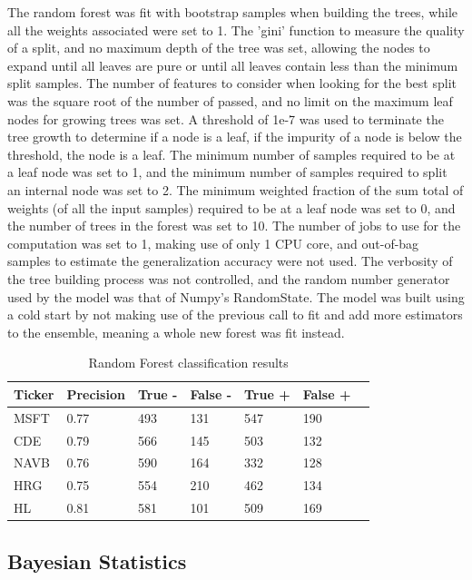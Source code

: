\documentclass[times]{jtitauth}
\begin{document}
The random forest was fit with bootstrap samples when building the trees, while all the weights associated were set to 1. The 'gini' function to measure the quality of a split, and no maximum depth of the tree was set, allowing the nodes to expand until all leaves are pure or until all leaves contain less than the minimum split samples. The number of features to consider when looking for the best split was the square root of the number of passed, and no limit on the maximum leaf nodes for growing trees was set. A threshold of 1e-7 was used to terminate the tree growth to determine if a node is a leaf, if the impurity of a node is below the threshold, the node is a leaf. The minimum number of samples required to be at a leaf node was set to 1, and the minimum number of samples required to split an internal node was set to 2. The minimum weighted fraction of the sum total of weights (of all the input samples) required to be at a leaf node was set to 0, and the number of trees in the forest was set to 10. The number of jobs to use for the computation was set to 1, making use of only 1 CPU core, and out-of-bag samples to estimate the generalization accuracy were not used. The verbosity of the tree building process was not controlled, and the random number generator used by the model was that of Numpy's RandomState. The model was built using a cold start by not making use of the previous call to fit and add more estimators to the ensemble, meaning a whole new forest was fit instead. 

\begin{table}
    \centering
        \begin{tabular}{ | l | l | l | | l | l | l | p{5cm} |}
        \hline
        Ticker & Precision & True - & False - & True + & False + \\ \hline
        MSFT & 0.77 & 493 & 131 & 547 & 190 \\ \hline
        CDE & 0.79 & 566 & 145 & 503 & 132 \\ \hline
        NAVB & 0.76 & 590 & 164 & 332 & 128 \\ \hline
        HRG & 0.75 & 554 & 210 & 462 & 134 \\ \hline
        HL & 0.81 & 581 & 101 & 509 & 169 \\
        \hline
        \end{tabular}
    \caption{Random Forest classification results}
\end{table}

\subsection{Bayesian Statistics}
\end{document}

